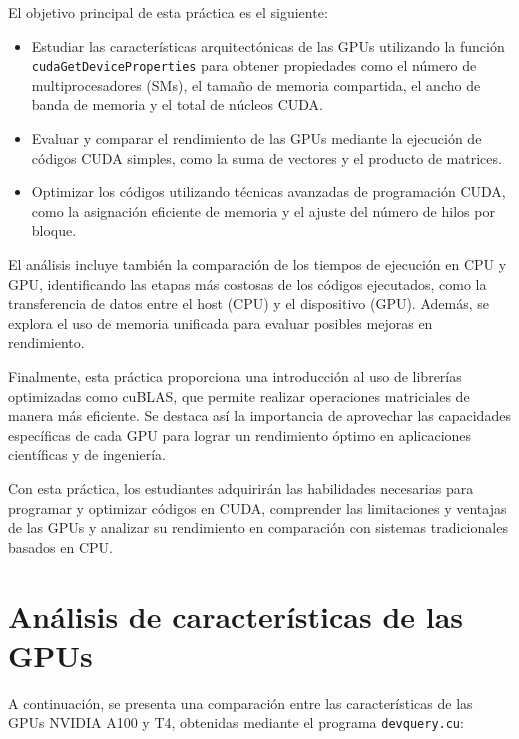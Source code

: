 \documentclass[twocolumn,a4paper,12pt]{article}
\begin{document}
El objetivo principal de esta práctica es el siguiente:
\begin{itemize}
    \item Estudiar las características arquitectónicas de las GPUs utilizando la función \texttt{cudaGetDeviceProperties} para obtener propiedades como el número de multiprocesadores (SMs), el tamaño de memoria compartida, el ancho de banda de memoria y el total de núcleos CUDA.
    \item Evaluar y comparar el rendimiento de las GPUs mediante la ejecución de códigos CUDA simples, como la suma de vectores y el producto de matrices.
    \item Optimizar los códigos utilizando técnicas avanzadas de programación CUDA, como la asignación eficiente de memoria y el ajuste del número de hilos por bloque.
\end{itemize}

El análisis incluye también la comparación de los tiempos de ejecución en CPU y GPU, identificando las etapas más costosas de los códigos ejecutados, como la transferencia de datos entre el host (CPU) y el dispositivo (GPU). Además, se explora el uso de memoria unificada para evaluar posibles mejoras en rendimiento.

Finalmente, esta práctica proporciona una introducción al uso de librerías optimizadas como cuBLAS, que permite realizar operaciones matriciales de manera más eficiente. Se destaca así la importancia de aprovechar las capacidades específicas de cada GPU para lograr un rendimiento óptimo en aplicaciones científicas y de ingeniería.

Con esta práctica, los estudiantes adquirirán las habilidades necesarias para programar y optimizar códigos en CUDA, comprender las limitaciones y ventajas de las GPUs y analizar su rendimiento en comparación con sistemas tradicionales basados en CPU.


\section{Análisis de características de las GPUs}
A continuación, se presenta una comparación entre las características de las GPUs NVIDIA A100 y T4, obtenidas mediante el programa \texttt{devquery.cu}:
\end{document}
